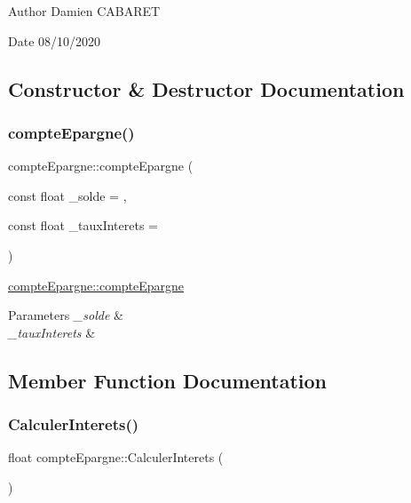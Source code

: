 \begin{DoxyAuthor}{Author}
Damien C\+A\+B\+A\+R\+ET 
\end{DoxyAuthor}
\begin{DoxyDate}{Date}
08/10/2020 
\end{DoxyDate}


\subsection{Constructor \& Destructor Documentation}
\mbox{\label{classcompte_epargne_aedb6ee7a479ebb8c3810e0694797546d}} 
\subsubsection{\texorpdfstring{compte\+Epargne()}{compteEpargne()}}
{\footnotesize\ttfamily compte\+Epargne\+::compte\+Epargne (\begin{DoxyParamCaption}\item[{const float}]{\+\_\+solde = {},  }\item[{const float}]{\+\_\+taux\+Interets = {} }\end{DoxyParamCaption})}



\hyperlink{classcompte_epargne_aedb6ee7a479ebb8c3810e0694797546d}{compte\+Epargne\+::compte\+Epargne} 


\begin{DoxyParams}{Parameters}
{\em \+\_\+solde} & \\
\hline
{\em \+\_\+taux\+Interets} & \\
\hline
\end{DoxyParams}


\subsection{Member Function Documentation}
\mbox{\label{classcompte_epargne_a1737ef49ba1ad55b8e9eebc3c2ae89ac}} 
\subsubsection{\texorpdfstring{Calculer\+Interets()}{CalculerInterets()}}
{\footnotesize\ttfamily float compte\+Epargne\+::\+Calculer\+Interets (\begin{DoxyParamCaption}{ }\end{DoxyParamCaption})}

